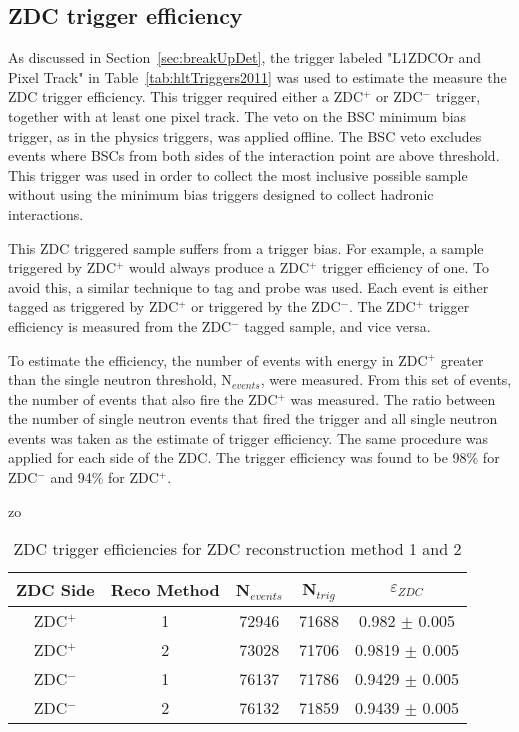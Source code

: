     \subsection{ZDC trigger efficiency}
      As discussed in Section~\ref{sec:breakUpDet}, the trigger labeled 
        "L1ZDCOr and Pixel Track" in Table~\ref{tab:hltTriggers2011} was used 
        to estimate the measure the ZDC trigger efficiency. 
      This trigger required either a ZDC$^{+}$ or ZDC$^{-}$ trigger, together with at 
        least one pixel track. 
      The veto on the BSC minimum bias trigger, as in the physics triggers, was
        applied offline.
      The BSC veto excludes events where BSCs from both sides of the 
        interaction point are above threshold. 
      This trigger was used in order to collect the most inclusive possible 
        sample without using the minimum bias triggers designed to collect 
        hadronic interactions.
        
      This ZDC triggered sample suffers from a trigger bias. 
      For example, a sample triggered by ZDC$^{+}$ would always produce a 
        ZDC$^{+}$ trigger efficiency of one. 
      To avoid this, a similar technique to tag and probe was used.
      Each event is either tagged as triggered by ZDC$^{+}$ or triggered 
        by the ZDC$^{-}$. 
      The ZDC$^{+}$ trigger efficiency is measured from the ZDC$^{-}$ tagged 
        sample, and vice versa.

      To estimate the efficiency, the number of events with energy in 
        ZDC$^{+}$ greater than the single neutron threshold, N$_{events}$, 
        were measured.
      From this set of events, the number of events that also fire the 
        ZDC$^{+}$ was measured.
      The ratio between the number of single neutron events that fired the 
        trigger and all single neutron events was taken as the estimate of 
        trigger efficiency. 
      The same procedure was applied for each side of the ZDC.
      The trigger efficiency was found to be 98\% for ZDC$^{-}$
        and 94\% for ZDC$^{+}$.

      \begin{table}zo
        \centering
        \begin{tabular}{|c|c|c|c|c|}
           ZDC Side & Reco Method & N$_{events}$ & N$_{trig}$ & $\varepsilon_{ZDC}$ \\ \hline
           ZDC$^{+}$ & 1 & 72946  & 71688 & 0.982 $\pm$ 0.005 \\ \hline
           ZDC$^{+}$ & 2 & 73028  & 71706  & 0.9819  $\pm$ 0.005  \\ \hline
           ZDC$^{-}$ & 1 & 76137  & 71786  & 0.9429  $\pm$ 0.005  \\ \hline
           ZDC$^{-}$ & 2 & 76132  & 71859  & 0.9439  $\pm$ 0.005  \\ \hline
        \end{tabular}
        \caption{ZDC trigger efficiencies for ZDC reconstruction method 1 and 
          2}
        \label{tab:zdcEfficiency}
      \end{table}

